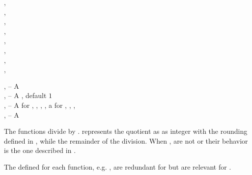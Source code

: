 \documentclass[../Type-Manipulation-Coercion.tex]{subfiles}
\begin{document}

\DSyntax{}

    \RArrow
{}, \\
    \RArrow
{}, \\
    \RArrow
{}, \\
    \RArrow
{}, \\
    \RArrow
{}, \\
    \RArrow
{}, \\
    \RArrow
{}, \\
    \RArrow
{}, \\

\DArgsNValues{}

,  -- A \\
,  -- A , default $1$\\
,  -- A  for , ,
, , a  for ,
, , \\
,  -- A \\

\DDescription{}

The functions divide  by .  represents the
quotient as as integer with the rounding defined in
\cite{1996:ANSIHyperSpec}, while  the remainder of the division. When
,  are not  or 
their behavior is the one described in \cite{1996:ANSIHyperSpec}.

\noindent
The  defined for each function, e.g. , are
redundant for  but are relevant for .
\end{document}
